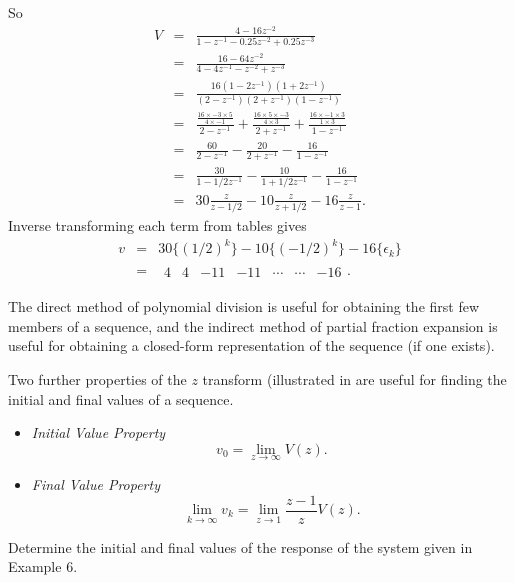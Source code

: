 So \begin{eqnarray*}
 V & =&  \frac{4-16z^{-2}}{1-z^{-1}-0.25 z^{-2} +
0.25 z^{-3}}\\ &=& \frac{16-64z^{-2}}{4-4z^{-1}-z^{-2} + z^{-3}}\\
&=&
\frac{16(1-2z^{-1})(1+2z^{-1})}{(2-z^{-1})(2+z^{-1})(1-z^{-1})}\\
&=& \frac{\frac{16\times -3\times 5}{4\times -1}}{2-z^{-1}} +
\frac{\frac{16\times 5\times -3}{4\times 3}}{2+z^{-1}} +
\frac{\frac{16\times -1 \times 3}{1\times 3}}{1-z^{-1}}
\\ &=&\frac{60}{2-z^{-1}} -
\frac{20}{2+z^{-1}} - \frac{16}{1-z^{-1}}
\\&=&\frac{30}{1-{1/2}z^{-1}} -
\frac{10}{1+{1/2}z^{-1}} - \frac{16}{1-z^{-1}}
\\
&=& 30\frac{z}{z-{1/2}} - 10\frac{z}{z+{1/2}} - 16\frac{z}{z-1}.
\end{eqnarray*}
Inverse transforming each term from tables gives
\begin{eqnarray*}v&=&30\{(1/2)^k\}-10\{(-1/2)^k\} -16 \{\epsilon_k\}\\
&=& \begin{array}{ccccccc}
  4 & 4 & -11 & -11 & \cdots & \cdots & -16
\end{array}.
\end{eqnarray*}

The direct method of polynomial division is useful for obtaining
the first few members of a sequence, and the indirect method of
partial fraction expansion is useful for obtaining a closed-form
representation of the sequence (if one exists).

Two further properties of the $z$ transform (illustrated in
 are useful for finding the initial and final
values of a sequence.
\begin{slide}\label{slide:l8s10}
  \begin{itemize}
  \item \emph{Initial Value Property} \[v_0 = \lim_{z\rightarrow
  \infty}V(z).\]
  \item \emph{Final Value Property} \[\lim_{k\rightarrow \infty}v_k = \lim_{z\rightarrow
      1}\frac{z-1}{z}V(z).\]
  \end{itemize}
\end{slide}

\begin{slide}
Determine the initial and final values of the response of the system given in Example 6.
\end{slide}

